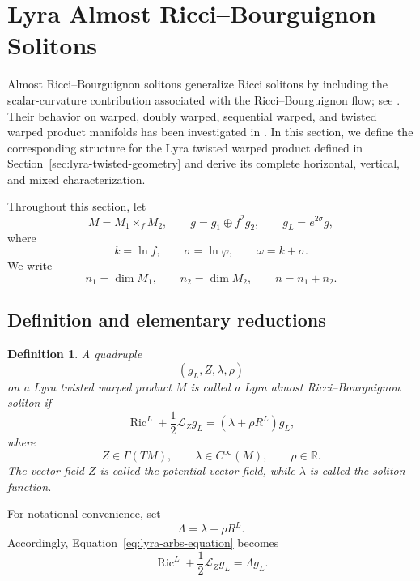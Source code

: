\documentclass[a4paper,11pt]{article}
\theoremstyle{plain}
\newtheorem{definition}{Definition}[section]
\numberwithin{equation}{section}
\begin{document}
\section{Lyra Almost Ricci--Bourguignon Solitons}
\label{sec:lyra-arbs}

Almost Ricci--Bourguignon solitons generalize Ricci solitons by
including the scalar-curvature contribution associated with the
Ricci--Bourguignon flow; see
\cite{CatinoEtAl2017,Dwivedi2021}. Their behavior on warped,
doubly warped, sequential warped, and twisted warped product
manifolds has been investigated in
\cite{BinTurkiEtAl2022,ShenawyEtAl2023,PahanDutta2023,
	KayaOzgur2024,ElsharkawyTawfiq2026}. In this section, we define
the corresponding structure for the Lyra twisted warped product
defined in Section~\ref{sec:lyra-twisted-geometry} and derive its
complete horizontal, vertical, and mixed characterization.

Throughout this section, let
\[
M=M_{1}\times_{f}M_{2},
\qquad
g=g_{1}\oplus f^{2}g_{2},
\qquad
g_{L}=e^{2\sigma}g,
\]
where
\[
k=\ln f,
\qquad
\sigma=\ln\varphi,
\qquad
\omega=k+\sigma.
\]
We write
\[
n_{1}=\dim M_{1},
\qquad
n_{2}=\dim M_{2},
\qquad
n=n_{1}+n_{2}.
\]

\subsection{Definition and elementary reductions}
\label{subsec:lyra-arbs-definition}

\begin{definition}
	\label{def:lyra-arbs}
	A quadruple
	\[
	(g_{L},Z,\lambda,\rho)
	\]
	on a Lyra twisted warped product \(M\) is called a
	\emph{Lyra almost Ricci--Bourguignon soliton} if
	\begin{equation}
		\operatorname{Ric}^{L}
		+
		\frac{1}{2}\mathcal L_{Z}g_{L}
		=
		\left(
		\lambda+\rho R^{L}
		\right)g_{L},
		\label{eq:lyra-arbs-equation}
	\end{equation}
	where
	\[
	Z\in\Gamma(TM),
	\qquad
	\lambda\in C^{\infty}(M),
	\qquad
	\rho\in\mathbb R.
	\]
	The vector field \(Z\) is called the \emph{potential vector
		field}, while \(\lambda\) is called the \emph{soliton function}.
\end{definition}

For notational convenience, set
\begin{equation}
	\Lambda
	=
	\lambda+\rho R^{L}.
	\label{eq:lyra-arbs-lambda}
\end{equation}
Accordingly, Equation~\eqref{eq:lyra-arbs-equation} becomes
\begin{equation}
	\operatorname{Ric}^{L}
	+
	\frac{1}{2}\mathcal L_{Z}g_{L}
	=
	\Lambda g_{L}.
	\label{eq:lyra-arbs-compact}
\end{equation}
\end{document}
